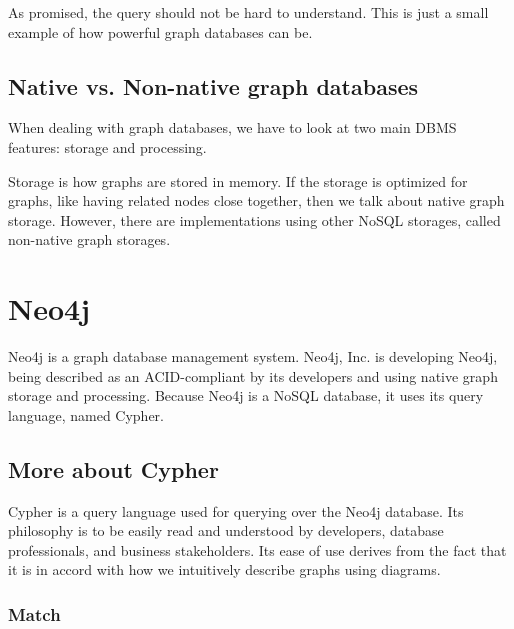 
As promised, the query should not be hard to understand. This is just a small example of how powerful graph databases can be.

\subsection {Native vs. Non-native graph databases}

When dealing with graph databases, we have to look at two main DBMS features: storage and processing.

Storage is how graphs are stored in memory. If the storage is optimized for graphs, like having related nodes close together, then we talk about native graph storage. However, there are implementations using other NoSQL storages, called non-native graph storages.

\section{Neo4j}

Neo4j is a graph database management system. Neo4j, Inc. is developing Neo4j, being described as an ACID-compliant by its developers and using native graph storage and processing. Because Neo4j is a NoSQL database, it uses its query language, named Cypher.

\subsection{More about Cypher}

Cypher is a query language used for querying over the Neo4j database. Its philosophy is to be easily read and understood by developers, database professionals, and business stakeholders. Its ease of use derives from the fact that it is in accord with how we intuitively describe graphs using diagrams. \cite{robinson_graph_2015}

\subsubsection{Match}
